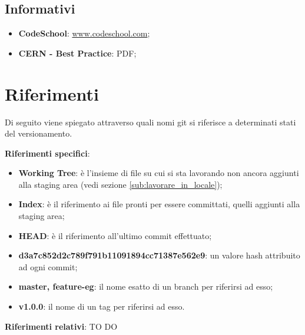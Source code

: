 	\subsection{Informativi} %
	\label{sub:informativi}
		\begin{itemize}
			\item \textbf{CodeSchool}: \url{www.codeschool.com};
			\item \textbf{CERN - Best Practice}: PDF;
		\end{itemize}


\newpage \clearpage
\section{Riferimenti} %
\label{sec:riferimenti}
Di seguito viene spiegato attraverso quali nomi git si riferisce a determinati stati del versionamento. \newline \newline

\textbf{Riferimenti specifici}:
	\begin{itemize}
		\item \textbf{Working Tree}: è l'insieme di file su cui si sta lavorando non ancora aggiunti alla staging area (vedi sezione \ref{sub:lavorare_in_locale});
		\item \textbf{Index}: è il riferimento ai file pronti per essere committati, quelli aggiunti alla staging area;
		\item \textbf{HEAD}: è il riferimento all'ultimo commit effettuato;
		\item \textbf{d3a7c852d2c789f791b11091894cc71387e562e9}: un valore hash attribuito ad ogni commit;
		\item \textbf{master, feature-eg}: il nome esatto di un branch per riferirsi ad esso;
		\item \textbf{v1.0.0}: il nome di un tag per riferirsi ad esso.
	\end{itemize}
	\noindent
\textbf{Riferimenti relativi}: TO DO

